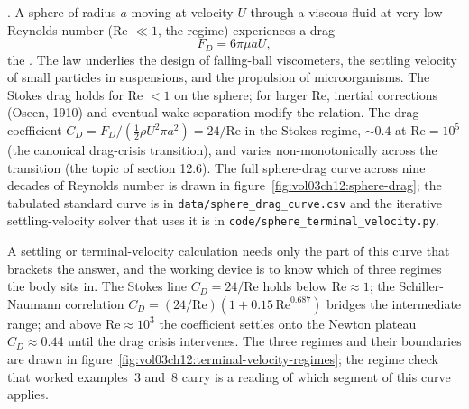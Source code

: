 . A sphere of radius $a$
moving at velocity $U$ through a viscous fluid at very low
Reynolds number (Re $\ll 1$, the  regime)
experiences a drag
\[
F_D = 6\pi \mu a U,
\]
the  \cite{paper:ch02t3b-stokes-1851}. The law underlies
the design of falling-ball viscometers, the settling velocity of
small particles in suspensions, and the propulsion of microorganisms.
The Stokes drag holds for Re $< 1$ on the sphere; for larger Re,
inertial corrections (Oseen, 1910) and eventual wake separation
modify the relation. The drag coefficient $C_D = F_D/(\tfrac{1}{2}
\rho U^2 \pi a^2) = 24/\text{Re}$ in the Stokes regime, $\sim 0.4$
at $\text{Re} = 10^5$ (the canonical drag-crisis transition), and
varies non-monotonically across the transition (the topic of
section 12.6). The full sphere-drag curve across nine decades of
Reynolds number is drawn in
figure~\ref{fig:vol03ch12:sphere-drag}; the tabulated standard
curve is in \texttt{data/sphere\_drag\_curve.csv} and the
iterative settling-velocity solver that uses it is in
\texttt{code/sphere\_terminal\_velocity.py}.



A settling or terminal-velocity calculation needs only the part of
this curve that brackets the answer, and the working device is to
know which of three regimes the body sits in. The Stokes line
$C_D = 24/\text{Re}$ holds below $\text{Re}\approx1$; the
Schiller-Naumann correlation $C_D = (24/\text{Re})(1 + 0.15\,
\text{Re}^{0.687})$ bridges the intermediate range; and above
$\text{Re}\approx10^3$ the coefficient settles onto the Newton
plateau $C_D\approx0.44$ until the drag crisis intervenes. The three
regimes and their boundaries are drawn in
figure~\ref{fig:vol03ch12:terminal-velocity-regimes}; the
regime check that worked examples~3 and~8 carry is a reading of which
segment of this curve applies.



